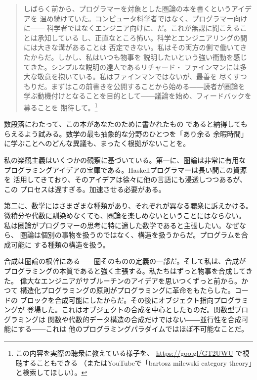 
\begin{quote}
  しばらく前から、プログラマーを対象とした圏論の本を書くというアイデアを
  温め続けていた。コンピュータ科学者ではなく、プログラマー向けに――
  科学者ではなくエンジニア向けに、だ。これが無謀に聞こえることは承知している
  し、正直なところ怖い。科学とエンジニアリングの間には大きな溝があることは
  否定できない。私はその両方の側で働いてきたからだ。しかし、私はいつも物事を
  説明したいという強い衝動を感じてきた。シンプルな説明の達人であるリチャード・
  ファインマンには多大な敬意を抱いている。私はファインマンではないが、最善を
  尽くすつもりだ。まずはこの前書きを公開することから始める――読者が圏論を
  学ぶ動機付けとなることを目的として――議論を始め、フィードバックを募ることを
  期待して。\footnote{
    この内容を実際の聴衆に教えている様子を、
    \href{https://goo.gl/GT2UWU}{https://goo.gl/GT2UWU} で視聴することもできる
    （またはYouTubeで「bartosz milewski category theory」と検索してほしい）。}
\end{quote}

\lettrine[lhang=0.17]{数}{段落にわたって}、この本があなたのために書かれたもの
であると納得してもらえるよう試みる。数学の最も抽象的な分野のひとつを「あり余る
余暇時間」に学ぶことへのどんな異議も、まったく根拠がないことを。

私の楽観主義はいくつかの観察に基づいている。第一に、圏論は非常に有用な
プログラミングアイデアの宝庫である。Haskellプログラマーは長い間この資源を
活用してきており、そのアイデアは徐々に他の言語にも浸透しつつあるが、この
プロセスは遅すぎる。加速させる必要がある。

第二に、数学にはさまざまな種類があり、それぞれが異なる聴衆に訴えかける。
微積分や代数に馴染めなくても、圏論を楽しめないということにはならない。
私は圏論がプログラマーの思考に特に適した数学であると主張したい。なぜなら、
圏論は個別の事物を扱うのではなく、構造を扱うからだ。プログラムを合成可能に
する種類の構造を扱う。

合成は圏論の根幹にある――圏そのものの定義の一部だ。そして私は、合成が
プログラミングの本質であると強く主張する。私たちはずっと物事を合成してきた。
偉大なエンジニアがサブルーチンのアイデアを思いつくずっと前から。かつて
構造化プログラミングの原則がプログラミングに革命をもたらした。コードの
ブロックを合成可能にしたからだ。その後にオブジェクト指向プログラミングが
登場した。これはオブジェクトの合成を中心としたものだ。関数型プログラミングは
関数や代数的データ構造の合成だけではない――並行性を合成可能にする――これは
他のプログラミングパラダイムではほぼ不可能なことだ。

